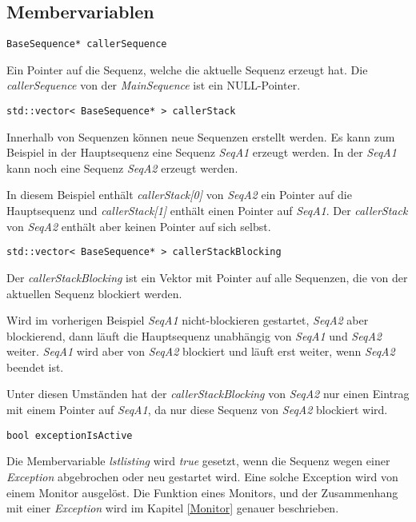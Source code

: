 \subsection{Membervariablen}
\begin{lstlisting}
BaseSequence* callerSequence
\end{lstlisting}
Ein Pointer auf die Sequenz, welche die aktuelle Sequenz erzeugt hat.
Die \textit{callerSequence} von der \textit{MainSequence} ist ein NULL-Pointer.


\begin{lstlisting}
std::vector< BaseSequence* > callerStack
\end{lstlisting}
Innerhalb von Sequenzen können neue Sequenzen erstellt werden.
Es kann zum Beispiel in der Hauptsequenz eine Sequenz \textit{SeqA1} erzeugt werden.
In der \textit{SeqA1} kann noch eine Sequenz \textit{SeqA2} erzeugt werden.

In diesem Beispiel enthält \textit{callerStack[0]} von \textit{SeqA2} ein Pointer auf die Hauptsequenz und \textit{callerStack[1]} enthält einen Pointer auf \textit{SeqA1}.
Der \textit{callerStack} von \textit{SeqA2} enthält aber keinen Pointer auf sich selbst.


\begin{lstlisting}
std::vector< BaseSequence* > callerStackBlocking
\end{lstlisting}
Der \textit{callerStackBlocking} ist ein Vektor mit Pointer auf alle Sequenzen, die von der aktuellen Sequenz blockiert werden.

Wird im vorherigen Beispiel \textit{SeqA1} nicht-blockieren gestartet, \textit{SeqA2} aber blockierend, dann läuft die Hauptsequenz unabhängig von \textit{SeqA1} und \textit{SeqA2} weiter.
\textit{SeqA1} wird aber von \textit{SeqA2} blockiert und läuft erst weiter, wenn \textit{SeqA2} beendet ist.

Unter diesen Umständen hat der \textit{callerStackBlocking} von \textit{SeqA2} nur einen Eintrag mit einem Pointer auf \textit{SeqA1}, da nur diese Sequenz von \textit{SeqA2} blockiert wird.


\begin{lstlisting}
bool exceptionIsActive 
\end{lstlisting}
Die Membervariable \textit{lstlisting} wird \textit{true} gesetzt, wenn die Sequenz wegen einer \textit{Exception} abgebrochen oder neu gestartet wird.
Eine solche Exception wird von einem Monitor ausgelöst.
Die Funktion eines Monitors, und der Zusammenhang mit einer \textit{Exception} wird im Kapitel \ref{Monitor} genauer beschrieben.


